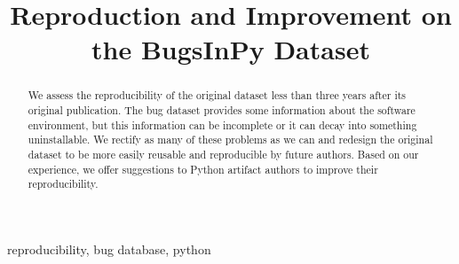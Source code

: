 \documentclass[conference]{IEEEtran}
\begin{document}
\title{Reproduction and Improvement on the BugsInPy Dataset}


\maketitle

\begin{abstract}
  We assess the reproducibility of the original dataset less than three years after its original publication.
  The bug dataset provides some information about the software environment, but this information can be incomplete or it can decay into something uninstallable.
  We rectify as many of these problems as we can and redesign the original dataset to be more easily reusable and reproducible by future authors.
  Based on our experience, we offer suggestions to Python artifact authors to improve their reproducibility. 
\end{abstract}

\begin{IEEEkeywords}
reproducibility, bug database, python
\end{IEEEkeywords}





\printbibliography
\end{document}
